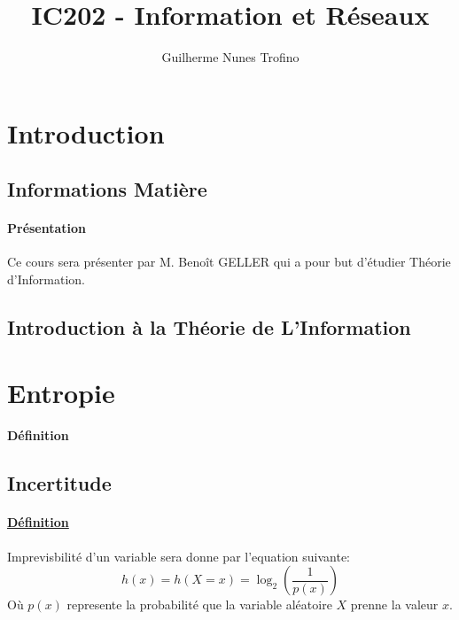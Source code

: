 \documentclass{article}
\title{IC202 - Information et Réseaux}
\author{Guilherme Nunes Trofino}
\begin{document}
\maketitle

\newpage\tableofcontents

\section{Introduction}

% 


\subsection{Informations Matière}
\paragraph{Présentation}Ce cours sera présenter par M. Benoît GELLER qui a pour but d'étudier Théorie d'Information.

\subsection{Introduction à la Théorie de L'Information}

\section{Entropie}
\paragraph{Définition}

\subsection{Incertitude}
\paragraph{\href{https://fr.wikipedia.org/wiki/Incertitude}{Définition}}Imprevisbilité d'un variable sera donne par l'equation suivante:
\begin{equation}\label{eq:incertitude}
    \boxed{
        h(x) = h(X=x) = \log_{2} \left(\frac{1}{p(x)}\right)
    }
\end{equation}
Où $p(x)$ represente la probabilité que la variable aléatoire $X$ prenne la valeur $x$.
\end{document}
